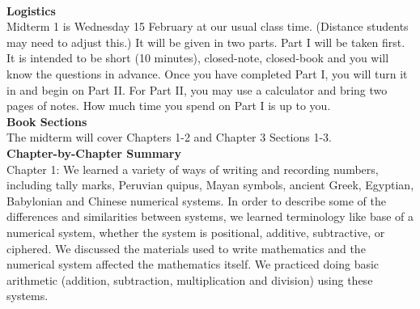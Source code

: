 \documentclass[11pt,fleqn]{article}
\begin{document}
\renewcommand{\headrulewidth}{0pt}
\newcommand{\blank}[1]{\rule{#1}{0.75pt}}
\newcommand{\bc}{\begin{center}}
\newcommand{\ec}{\end{center}}
\renewcommand{\d}{\displaystyle}

\vspace*{-0.7in}

\begin{center}
  \large
  \\
\end{center}
\noindent\textbf{Logistics}\\

Midterm 1 is Wednesday 15 February at our usual class time. (Distance students may need to adjust this.) It will be given in two parts. Part I will be taken first. It is intended to be short (10 minutes), closed-note, closed-book and you will know the questions in advance. Once you have completed Part I, you will turn it in and begin on Part II.  For Part II, you may use a calculator and bring two pages of notes. How much time you spend on Part I is up to you.  \\

\noindent\textbf{Book Sections}\\

The midterm will cover Chapters 1-2 and Chapter 3 Sections 1-3.\\

\noindent\textbf{Chapter-by-Chapter Summary}\\

Chapter 1: We learned a variety of ways of writing and recording numbers, including tally marks,  Peruvian quipus, Mayan symbols, ancient Greek, Egyptian, Babylonian and Chinese numerical systems. In order to describe some of the differences and similarities between systems, we learned terminology like base of a numerical system, whether the system is positional, additive, subtractive,  or ciphered. We discussed the materials used to write mathematics and the numerical system affected the mathematics itself. We practiced doing basic arithmetic (addition, subtraction, multiplication and division) using these systems.\\
\end{document}
